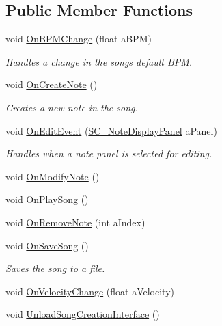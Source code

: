 \subsection*{Public Member Functions}
\begin{DoxyCompactItemize}
\item 
void \hyperlink{group___s_c_handlers_ga867d521ac1d7184636c40dad3ebd43b0}{On\+B\+P\+M\+Change} (float a\+B\+PM)
\begin{DoxyCompactList}\small\item\em Handles a change in the song\textquotesingle{}s default B\+PM. \end{DoxyCompactList}\item 
void \hyperlink{group___s_c_handlers_ga70f2fdac755a6b62f48afd96f2446d71}{On\+Create\+Note} ()
\begin{DoxyCompactList}\small\item\em Creates a new note in the song. \end{DoxyCompactList}\item 
void \hyperlink{group___s_c_handlers_ga0e93e30073bd61526f8ac1431cc4d2b6}{On\+Edit\+Event} (\hyperlink{class_s_c___note_display_panel}{S\+C\+\_\+\+Note\+Display\+Panel} a\+Panel)
\begin{DoxyCompactList}\small\item\em Handles when a note panel is selected for editing. \end{DoxyCompactList}\item 
void \hyperlink{group___s_c_handlers_gadcf6d627fa8dc06d04c27512ce59dd85}{On\+Modify\+Note} ()
\item 
void \hyperlink{group___s_c_handlers_gab333656dbc41fbebb320a30c48501370}{On\+Play\+Song} ()
\item 
void \hyperlink{group___s_c_handlers_ga485d615c895cddde720b719b64ab4245}{On\+Remove\+Note} (int a\+Index)
\item 
void \hyperlink{group___s_c_handlers_ga3fac289dfb9e67d94afbeb0dfdb22f48}{On\+Save\+Song} ()
\begin{DoxyCompactList}\small\item\em Saves the song to a file. \end{DoxyCompactList}\item 
void \hyperlink{group___s_c_handlers_ga929912496540563f4ec02295a0d333c6}{On\+Velocity\+Change} (float a\+Velocity)
\item 
void \hyperlink{group___s_c_handlers_gae631852736624d333cc26e1ae9d14871}{Unload\+Song\+Creation\+Interface} ()
\end{DoxyCompactItemize}
